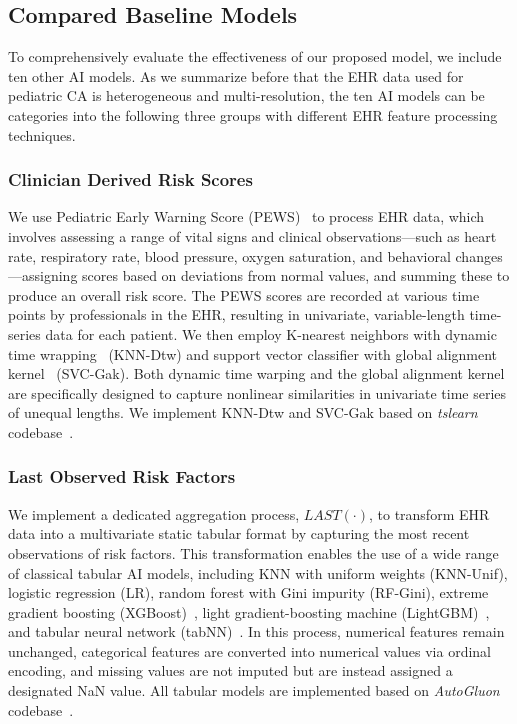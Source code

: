 \subsection{Compared Baseline Models}
To comprehensively evaluate the effectiveness of our proposed model, we include ten other AI models. As we summarize before that the EHR data used for pediatric CA is heterogeneous and multi-resolution, the ten AI models can be categories into the following three groups with different EHR feature processing techniques.
\subsubsection{Clinician Derived Risk Scores} We use Pediatric Early Warning Score (PEWS)~\cite{monaghan2005pews} to process EHR data, which involves assessing a range of vital signs and clinical observations—such as heart rate, respiratory rate, blood pressure, oxygen saturation, and behavioral changes—assigning scores based on deviations from normal values, and summing these to produce an overall risk score. The PEWS scores are recorded at various time points by professionals in the EHR, resulting in univariate, variable-length time-series data for each patient.
We then employ K-nearest neighbors with dynamic time wrapping~\cite{sakoe1978dtw} (KNN-Dtw) and support vector classifier with global alignment kernel~\cite{cuturi2011gak} (SVC-Gak). Both dynamic time warping and the global alignment kernel are specifically designed to capture nonlinear similarities in univariate time series of unequal lengths. We implement KNN-Dtw and SVC-Gak based on \textit{tslearn} codebase~\cite{tslearn}.
\subsubsection{Last Observed Risk Factors} We implement a dedicated aggregation process, $LAST(\cdot)$, to transform EHR data into a multivariate static tabular format by capturing the most recent observations of risk factors.  This transformation enables the use of a wide range of classical tabular AI models, including KNN with uniform weights (KNN-Unif), logistic regression (LR), random forest with Gini impurity (RF-Gini), extreme gradient boosting (XGBoost)~\cite{chen2016xgboost}, light gradient-boosting machine (LightGBM)~\cite{ke2017lightgbm}, and tabular neural network (tabNN)~\cite{ke2018tabnn}. In this process, numerical features remain unchanged, categorical features are converted into numerical values via ordinal encoding, and missing values are not imputed but are instead assigned a designated NaN value. All tabular models are implemented based on \textit{AutoGluon} codebase~\cite{erickson2020autogluon}.

